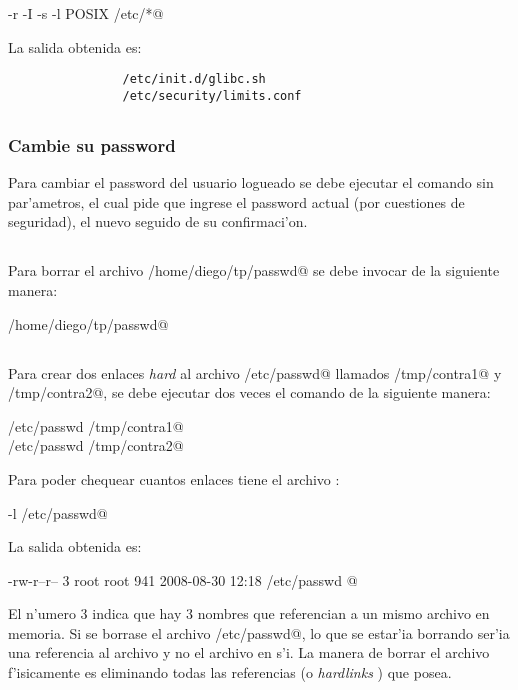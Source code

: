 			\verb@grep -r -I -s -l POSIX /etc/*@

			La salida obtenida es:
			\begin{mylisting}
			\begin{verbatim}
				/etc/init.d/glibc.sh
				/etc/security/limits.conf
			\end{verbatim}
			\end{mylisting}
			
	\subsection{}
		\subsubsection[]{Cambie su password}
		
			Para cambiar el password del usuario logueado se debe ejecutar el comando \verb@passwd@ sin par'ametros, el cual pide que ingrese el password actual (por cuestiones de seguridad), el nuevo seguido de su confirmaci'on. 
			
	\subsection{}
	
		Para borrar el archivo \verb@/home/diego/tp/passwd@ se debe invocar \verb@rm@ de la siguiente manera:

		\verb@rm /home/diego/tp/passwd@
	
	\subsection{}

		Para crear dos enlaces \emph{hard} al archivo \verb@/etc/passwd@ llamados \verb@/tmp/contra1@ y \verb@/tmp/contra2@, se debe ejecutar dos veces el comando \verb@ln@ de la siguiente manera:

	\noindent \verb@ln /etc/passwd /tmp/contra1@\\
		\verb@ln /etc/passwd /tmp/contra2@

		Para poder chequear cuantos enlaces tiene el archivo \verb@\etc\passwd@:

		\verb@ls -l /etc/passwd@

	\noindent La salida obtenida es:

		\verb@-rw-r--r--  3 root     root      941 2008-08-30 12:18 /etc/passwd @

		El n'umero 3 indica que hay 3 nombres que referencian a un mismo archivo en memoria. Si se borrase el archivo \verb@/etc/passwd@, lo que se estar'ia borrando ser'ia una referencia al archivo y no el archivo en s'i. La manera de borrar el archivo f'isicamente es eliminando todas las referencias (o \emph{hardlinks} ) que posea.

